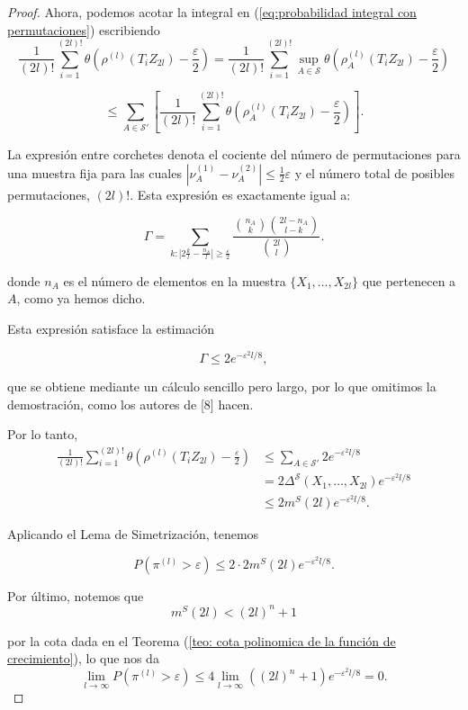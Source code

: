 \documentclass{report}
\begin{document}
\begin{proof}
Ahora, podemos acotar la integral en (\ref{eq:probabilidad integral con permutaciones}) escribiendo
\[
\frac{1}{(2l)!} \sum_{i=1}^{(2l)!} \theta \left(  \rho^{(l)}(T_i Z_{2l}) - \frac{\varepsilon}{2}  \right) 
= \frac{1}{(2l)!} \sum_{i=1}^{(2l)!} \sup_{A \in \mathcal{S}} \theta \left(  \rho^{(l)}_A(T_i Z_{2l}) - \frac{\varepsilon}{2}  \right)
\]

\[
\leq \sum_{A \in \mathcal{S}'} \left[ \frac{1}{(2l)!} \sum_{i=1}^{(2l)!} \theta \left(  \rho^{(l)}_A(T_i Z_{2l}) - \frac{\varepsilon}{2}  \right) \right].
\]

La expresión entre corchetes denota el cociente del número de permutaciones para una muestra fija 
para las cuales \( |\nu^{(1)}_A - \nu^{(2)}_A| \leq \frac{1}{2} \varepsilon \) y el número total de posibles permutaciones, $(2l)!$. Esta expresión
es exactamente igual a:

\[
\Gamma = \sum_{k : |2\frac{k}{l} - \frac{n_A}{l}| \geq \frac{\varepsilon}{2}} \frac{\binom{n_A}{k} \binom{2l - n_A}{l - k}}{\binom{2l}{l}}.
\]

donde \( n_A \) es el número de elementos en la muestra \( \{X_1, \dots, X_{2l}\} \) que pertenecen a \( A \), como ya hemos dicho. \newline 

Esta expresión satisface la estimación 

\[
\Gamma \leq 2 e^{-\varepsilon^2 l / 8},
\]

que se obtiene mediante un cálculo sencillo pero largo, por lo que omitimos la demostración, como los autores de [8] hacen. \newline

Por lo tanto,
\begin{equation*}
\begin{aligned}
\frac{1}{(2l)!} \sum_{i=1}^{(2l)!} \theta \left(  \rho^{(l)}(T_i Z_{2l}) - \frac{\varepsilon}{2} \right) 
&\leq \sum_{A \in \mathcal{S}'} 2 e^{-\varepsilon^2 l / 8} \\
&= 2 \Delta^{\mathcal{S}}(X_1, \dots, X_{2l}) e^{-\varepsilon^2 l / 8}\\
&\leq 2 m^S(2l) e^{-\varepsilon^2 l / 8}.
\end{aligned}
\end{equation*}

Aplicando el Lema de Simetrización, tenemos

\[
P\left(\pi^{(l)}>\varepsilon\right) \leq 2 \cdot 2 m^S(2l) e^{-\varepsilon^2 l / 8}.
\]

Por último, notemos que 
\[
m^S(2l)<(2l)^n + 1
\]

por la cota dada en el Teorema (\ref{teo: cota polinomica de la función de crecimiento}), lo que nos da
\[
\lim_{l\to\infty} P\left(\pi^{(l)}>\varepsilon\right) \leq 4 \lim_{l\to\infty} ((2l)^n+1) e^{-\varepsilon^2 l / 8} = 0.
\]

\end{proof}
\end{document}
